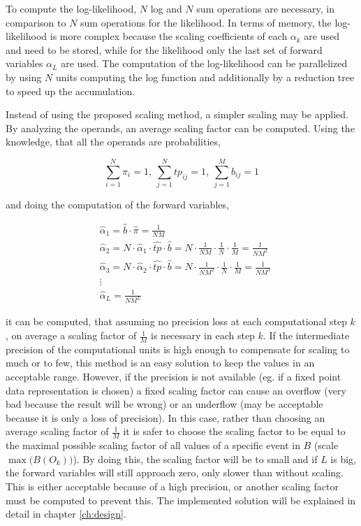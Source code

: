 \documentclass[mscthesis]{usiinfthesis}
\begin{document}
To compute the log-likelihood, $N$ log and $N$ sum operations are necessary, in
comparison to $N$ sum operations for the likelihood. In terms of memory, the
log-likelihood is more complex because the scaling coefficients of each
$\alpha_k$ are used and need to be stored, while for the likelihood only the
last set of forward variables $\alpha_L$ are used. The computation of the
log-likelihood can be parallelized by using $N$ units computing the log
function and additionally by a reduction tree to speed up the accumulation.

Instead of using the proposed scaling method, a simpler scaling may be applied.
By analyzing the operands, an average scaling factor can be computed. Using the
knowledge, that all the operands are probabilities,

\begin{equation}
    \label{eq:scaling_sum}
    \sum\limits_{i=1}^{N} \pi_i = 1, \
    \sum\limits_{j=1}^{N} tp_{ij} = 1, \
    \sum\limits_{j=1}^{M} b_{ij} = 1
\end{equation}

and doing the computation of the forward variables,

\begin{equation}\begin{split}
    \label{eq:scaling_estimation}
    &\hat{\alpha}_1 = \hat{b} \cdot \hat{\pi} = \frac{1}{NM} \\
    &\hat{\alpha}_2 = N \cdot \hat{\alpha}_1 \cdot \hat{tp} \cdot \hat{b} =
        N \cdot \frac{1}{NM} \cdot \frac{1}{N} \cdot \frac{1}{M} =
        \frac{1}{NM^2} \\
    &\hat{\alpha}_3 = N \cdot \hat{\alpha}_2 \cdot \hat{tp} \cdot \hat{b} =
        N \cdot \frac{1}{NM^2} \cdot \frac{1}{N} \cdot \frac{1}{M} =
        \frac{1}{NM^3} \\
    &\vdots\\
    & \hat{\alpha}_L = \frac{1}{NM^L}
\end{split}\end{equation}

it can be computed, that assuming no precision loss at each computational step
$k$, on average a scaling factor of $\frac{1}{M}$ is necessary in each step
$k$. If the intermediate precision of the computational units is high enough to
compensate for scaling to much or to few, this method is an easy solution to
keep the values in an acceptable range. However, if the precision is not
available (eg. if a fixed point data representation is chosen) a fixed scaling
factor can cause an overflow (very bad because the result will be wrong) or an
underflow (may be acceptable because it is only a loss of precision). In this
case, rather than choosing an average scaling factor of $\frac{1}{M}$ it is
safer to choose the scaling factor to be equal to the maximal possible scaling
factor of all values of a specific event in $B$ (scale $\max\big(B(O_k)\big)$).
By doing this, the scaling factor will be to small and if $L$ is big, the
forward variables will still approach zero, only slower than without scaling.
This is either acceptable because of a high precision, or another scaling
factor must be computed to prevent this. The implemented solution will be
explained in detail in chapter \ref{ch:design}.
\end{document}
